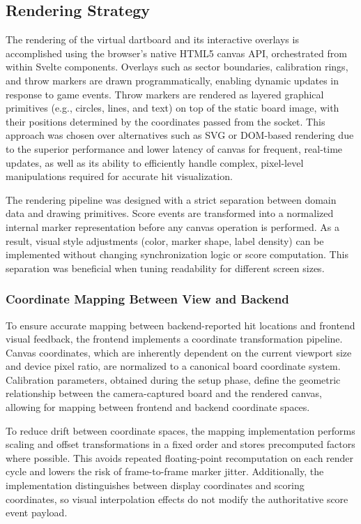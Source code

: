 \subsection{Rendering Strategy}
The rendering of the virtual dartboard and its interactive overlays is accomplished using the browser's native HTML5 canvas API, orchestrated from within Svelte components. Overlays such as sector boundaries, calibration rings, and throw markers are drawn programmatically, enabling dynamic updates in response to game events. Throw markers are rendered as layered graphical primitives (e.g., circles, lines, and text) on top of the static board image, with their positions determined by the coordinates passed from the socket. This approach was chosen over alternatives such as SVG or DOM-based rendering due to the superior performance and lower latency of canvas for frequent, real-time updates, as well as its ability to efficiently handle complex, pixel-level manipulations required for accurate hit visualization.

The rendering pipeline was designed with a strict separation between domain data and drawing primitives. Score events are transformed into a normalized internal marker representation before any canvas operation is performed. As a result, visual style adjustments (color, marker shape, label density) can be implemented without changing synchronization logic or score computation. This separation was beneficial when tuning readability for different screen sizes.

\subsubsection{Coordinate Mapping Between View and Backend}
To ensure accurate mapping between backend-reported hit locations and frontend visual feedback, the frontend implements a coordinate transformation pipeline. Canvas coordinates, which are inherently dependent on the current viewport size and device pixel ratio, are normalized to a canonical board coordinate system. Calibration parameters, obtained during the setup phase, define the geometric relationship between the camera-captured board and the rendered canvas, allowing for mapping between frontend and backend coordinate spaces.

To reduce drift between coordinate spaces, the mapping implementation performs scaling and offset transformations in a fixed order and stores precomputed factors where possible. This avoids repeated floating-point recomputation on each render cycle and lowers the risk of frame-to-frame marker jitter. Additionally, the implementation distinguishes between display coordinates and scoring coordinates, so visual interpolation effects do not modify the authoritative score event payload.

